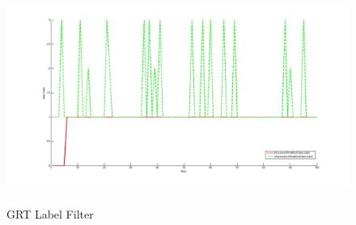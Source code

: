 \begin{figure}
	[h] \centering 
	\includegraphics[height=7cm]{figures/content/grt-label-filter.jpg} \caption{GRT Label  Filter} \label{fg:grt:label} 
\end{figure}
